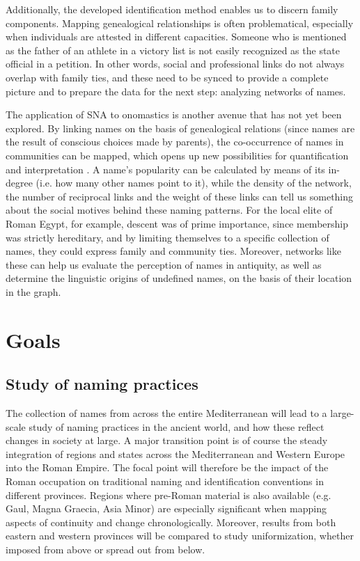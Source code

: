 \documentclass[amsthm,ebook]{saparticle}
\begin{document}
Additionally, the developed identification method enables us to discern family components. Mapping genealogical
relationships is often problematical, especially when individuals are attested in different capacities. Someone who is
mentioned as the father of an athlete in a victory list is not easily recognized as the state official in a petition.
In other words, social and professional links do not always overlap with family ties, and these need to be synced to
provide a complete picture and to prepare the data for the next step: analyzing networks of names.

The application of SNA to onomastics is another avenue that has not yet been explored. By linking names on the basis of
genealogical relations (since names are the result of conscious choices made by parents), the co-occurrence of names in
communities can be mapped, which opens up new possibilities for quantification and interpretation \citep{Broux2015c}. A
name's popularity can be calculated by means of its in-degree (i.e. how many other names point to it), while the
density of the network, the number of reciprocal links and the weight of these links can tell us something about the
social motives behind these naming patterns. For the local elite of Roman Egypt, for example, descent was of prime
importance, since membership was strictly hereditary, and by limiting themselves to a specific collection of names,
they could express family and community ties. Moreover, networks like these can help us evaluate the perception of
names in antiquity, as well as determine the linguistic origins of undefined names, on the basis of their location in
the graph.

\section{Goals}
\subsection{Study of naming practices}


\noindent The collection of names from across the entire Mediterranean will lead to a large-scale study of naming practices in the
ancient world, and how these reflect changes in society at large. A major transition point is of course the steady
integration of regions and states across the Mediterranean and Western Europe into the Roman Empire. The focal point
will therefore be the impact of the Roman occupation on traditional naming and identification conventions in different
provinces. Regions where pre-Roman material is also available (e.g. Gaul, Magna Graecia, Asia Minor) are especially
significant when mapping aspects of continuity and change chronologically. Moreover, results from both eastern and
western provinces will be compared to study uniformization, whether imposed from above or spread out from below.
\end{document}
